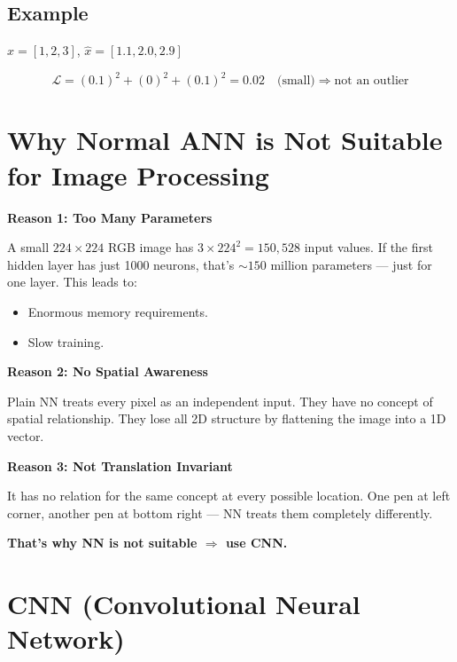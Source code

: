 \documentclass[12pt,a4paper]{article}
\begin{document}
\subsection{Example}

\begin{examplebox}
$x = [1, 2, 3]$, $\hat{x} = [1.1, 2.0, 2.9]$

\[
\mathcal{L} = (0.1)^2 + (0)^2 + (0.1)^2 = 0.02 \quad \text{(small)} \Rightarrow \text{not an outlier}
\]
\end{examplebox}

\section{Why Normal ANN is Not Suitable for Image Processing}

\textbf{Reason 1: Too Many Parameters}

A small $224 \times 224$ RGB image has $3 \times 224^2 = 150{,}528$ input values. If the first hidden layer has just 1000 neurons, that's $\sim 150$ million parameters --- just for one layer. This leads to:
\begin{itemize}
  \item Enormous memory requirements.
  \item Slow training.
\end{itemize}

\textbf{Reason 2: No Spatial Awareness}

Plain NN treats every pixel as an independent input. They have no concept of spatial relationship. They lose all 2D structure by flattening the image into a 1D vector.

\textbf{Reason 3: Not Translation Invariant}

It has no relation for the same concept at every possible location. One pen at left corner, another pen at bottom right --- NN treats them completely differently.

\textbf{That's why NN is not suitable $\Rightarrow$ use CNN.}

\section{CNN (Convolutional Neural Network)}
\end{document}
